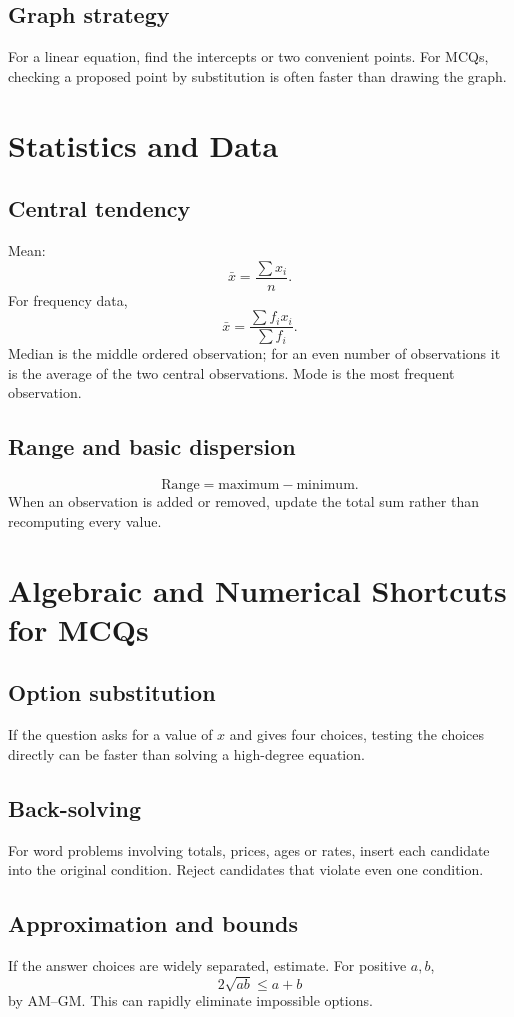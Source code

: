 \documentclass[12pt,a4paper,oneside]{book}
\begin{document}
\section{Graph strategy}
For a linear equation, find the intercepts or two convenient points. For MCQs, checking a proposed point by substitution is often faster than drawing the graph.

\chapter[Statistics and Data]{Statistics and Data}
\section{Central tendency}
Mean:
\[\bar x=\frac{\sum x_i}{n}.\]
For frequency data,
\[\bar x=\frac{\sum f_ix_i}{\sum f_i}.\]
Median is the middle ordered observation; for an even number of observations it is the average of the two central observations. Mode is the most frequent observation.

\section{Range and basic dispersion}
\[\text{Range}=\text{maximum}-\text{minimum}.\]
When an observation is added or removed, update the total sum rather than recomputing every value.

\chapter[MCQ Shortcuts]{Algebraic and Numerical Shortcuts for MCQs}
\section{Option substitution}
If the question asks for a value of \(x\) and gives four choices, testing the choices directly can be faster than solving a high-degree equation.

\section{Back-solving}
For word problems involving totals, prices, ages or rates, insert each candidate into the original condition. Reject candidates that violate even one condition.

\section{Approximation and bounds}
If the answer choices are widely separated, estimate. For positive \(a,b\),
\[2\sqrt{ab}\le a+b\]
by AM--GM. This can rapidly eliminate impossible options.
\end{document}
